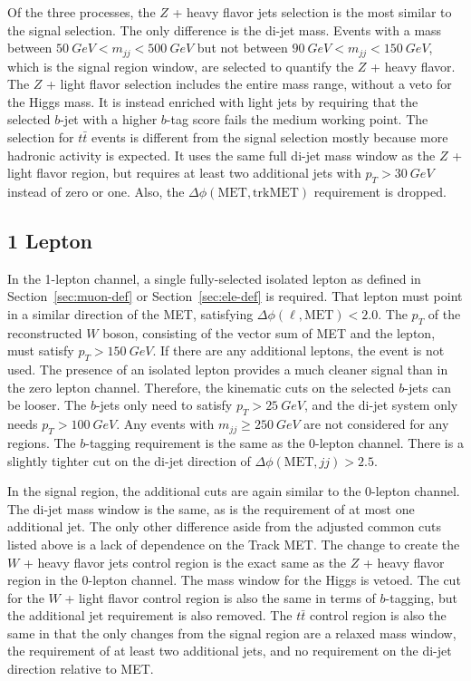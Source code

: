 Of the three processes,
the $Z$ + heavy flavor jets selection is the most similar to the signal selection.
The only difference is the di-jet mass.
Events with a mass between $\SI{50}{GeV} < m_{jj} < \SI{500}{GeV}$ but not between
$\SI{90}{GeV} < m_{jj} < \SI{150}{GeV}$, which is the signal region window,
are selected to quantify the $Z$ + heavy flavor.
The $Z$ + light flavor selection includes the entire mass range,
without a veto for the Higgs mass.
It is instead enriched with light jets by requiring that the selected $b$-jet with
a higher $b$-tag score fails the medium working point.
The selection for $t\bar{t}$ events is different from the signal selection
mostly because more hadronic activity is expected.
It uses the same full di-jet mass window as the $Z$ + light flavor region,
but requires at least two additional jets with $p_T > \SI{30}{GeV}$ instead of zero or one.
Also, the $\Delta \phi(\mathrm{MET}, \mathrm{trkMET})$ requirement is dropped.

\subsection{1 Lepton} \label{sec:resolved-1}

In the 1-lepton channel, a single fully-selected isolated lepton as defined in
Section~\ref{sec:muon-def} or Section~\ref{sec:ele-def} is required.
That lepton must point in a similar direction of the MET,
satisfying $\Delta \phi(\ell, \mathrm{MET}) < 2.0$.
The $p_T$ of the reconstructed $W$ boson, consisting of the vector sum of MET and the lepton,
must satisfy $p_T > \SI{150}{GeV}$.
If there are any additional leptons, the event is not used.
The presence of an isolated lepton provides
a much cleaner signal than in the zero lepton channel.
Therefore, the kinematic cuts on the selected $b$-jets can be looser.
The $b$-jets only need to satisfy $p_T > \SI{25}{GeV}$,
and the di-jet system only needs $p_T > \SI{100}{GeV}$.
Any events with $m_{jj} \ge \SI{250}{GeV}$ are not considered for any regions.
The $b$-tagging requirement is the same as the 0-lepton channel.
There is a slightly tighter cut on the di-jet direction of $\Delta\phi(\mathrm{MET}, jj) > 2.5$.

In the signal region, the additional cuts are again similar to the 0-lepton channel.
The di-jet mass window is the same, as is the requirement of at most one additional jet.
The only other difference aside from the adjusted common cuts listed above
is a lack of dependence on the Track MET.
The change to create the $W$ + heavy flavor jets control region is the exact same as the
$Z$ + heavy flavor region in the 0-lepton channel.
The mass window for the Higgs is vetoed.
The cut for the $W$ + light flavor control region is also the same in terms of $b$-tagging,
but the additional jet requirement is also removed.
The $t\bar{t}$ control region is also the same in that the only changes from the signal region
are a relaxed mass window, the requirement of at least two additional jets,
and no requirement on the di-jet direction relative to MET.

